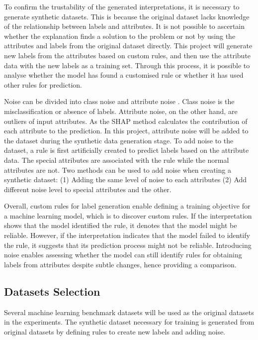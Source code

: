 \documentclass[runningheads,a4paper]{llncs}
\begin{document}
To confirm the trustability of the generated interpretations, it is necessary to generate synthetic datasets. This is because the original dataset lacks knowledge of the relationship between labels and attributes. It is not possible to ascertain whether the explanation finds a solution to the problem or not by using the attributes and labels from the original dataset directly. This project will generate new labels from the attributes based on custom rules, and then use the attribute data with the new labels as a training set.
Through this process, it is possible to analyse whether the model has found a customised rule or whether it has used other rules for prediction.

Noise can be divided into class noise and attribute noise \cite{Zhu2004}. 
Class noise is the misclassification or absence of labels.
Attribute noise, on the other hand, are outliers of input attributes.
As the SHAP method calculates the contribution of each attribute to the prediction.
In this project, attribute noise will be added to the dataset during the synthetic data generation stage.
To add noise to the dataset, a rule is first artificially created to predict labels based on the attribute data. The special attributes are associated with the rule while the normal attributes are not. Two methods can be used to add noise when creating a synthetic dataset: (1) Adding the same level of noise to each attributes (2) Add different noise level to special attributes and the other.

Overall, custom rules for label generation enable defining a training objective for a machine learning model, which is to discover custom rules. If the interpretation shows that the model identified the rule, it denotes that the model might be reliable. However, if the interpretation indicates that the model failed to identify the rule, it suggests that its prediction process might not be reliable.
Introducing noise enables assessing whether the model can still identify rules for obtaining labels from attributes despite subtle changes, hence providing a comparison.

\subsection{Datasets Selection}
Several machine learning benchmark datasets will be used as the original datasets in the experiments. 
The synthetic dataset necessary for training is generated from original datasets by defining rules to create new labels and adding noise.
\end{document}
